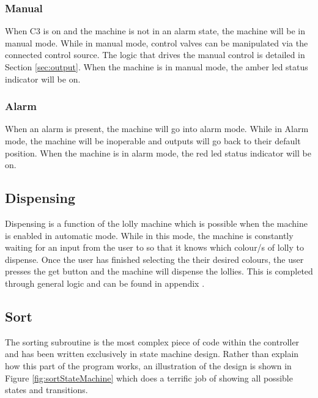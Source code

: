         \subsubsection{Manual}
            When C3 is on and the machine is not in an alarm state, the machine will be in manual mode. While in manual mode, control valves can be manipulated via the connected control source. The logic that drives the manual control is detailed in Section \ref{sec:output}.
            When the machine is in manual mode, the amber \acrshort{led} status indicator will be on. 

        \subsubsection{Alarm}
            When an alarm is present, the machine will go into alarm mode. While in Alarm mode, the machine will be inoperable and outputs will go back to their default position. When the machine is in alarm mode, the red \acrshort{led} status indicator will be on.

    \subsection{Dispensing}
        Dispensing is a function of the lolly machine which is possible when the machine is enabled in automatic mode. While in this mode, the machine is constantly waiting for an input from the user to so that it knows which colour/s of lolly to dispense. Once the user has finished selecting the their desired colours, the user presses the get button and the machine will dispense the lollies. This is completed through general logic and can be found in appendix .
        
    \subsection{Sort}
        The sorting subroutine is the most complex piece of code within the controller and has been written exclusively in state machine design. Rather than explain how this part of the program works, an illustration of the design is shown in Figure \ref{fig:sortStateMachine} which does a terrific job of showing all possible states and transitions. 

